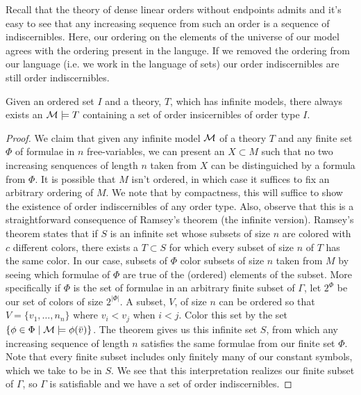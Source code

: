 Recall that the theory of dense linear orders without endpoints admits \qe and it's easy to see that any increasing sequence from such an order is a sequence of indiscernibles. 
Here, our ordering on the elements of the universe of our model agrees with the ordering present in the languge. 
If we removed the ordering from our language (i.e. we work in the language of sets) our order indiscernibles are still order indiscernibles. 

\begin{theorem}\label{theorem_order_indiscernibles}
Given an ordered set \(I\) and a theory, \(T\), which has infinite models, there always exists an \(\mathcal{M} \models T\) containing a set of order insicernibles of order type \(I\). 
\end{theorem}


\begin{proof}
We claim that given any infinite model \(\mathcal{M}\) of a theory \(T\) and any finite set \(\Phi\) of formulae in \(n\) free-variables, we can present an \(X \subset M\) such that no two increasing senquences of length \(n\) taken from \(X\) can be distinguiched by a formula from \(\Phi\). 
It is possible that \(M\) isn't ordered, in which case it suffices to fix an arbitrary ordering of \(M\). 
We note that by compactness, this will suffice to show the existence of order indiscernibles of any order type. 
Also, observe that this is a straightforward consequence of Ramsey's theorem (the infinite version).
Ramsey's theorem states that if \(S\) is an infinite set whose subsets of size \(n\) are colored with \(c\) different colors, there exists a \(T \subset S\) for which every subset of size \(n\) of \(T\) has the same color. 
In our case, subsets of \(\Phi\) color subsets of size \(n\) taken from \(M\) by seeing which formulae of \(\Phi\) are true of the (ordered) elements of the subset. %
More specifically if \(\Phi\) is the set of formulae in an arbitrary finite subset of \(\Gamma\), let \(2^\Phi\) be our set of colors of size \(2^{|\Phi|}\). 
A subset, \(V\), of size \(n\) can be ordered so that \(V = \{v_1, \ldots, n_n\}\) where \(v_i < v_j\) when \(i < j\). 
Color this set by the set \(\{\phi \in \Phi \mid \mathcal{M} \models \phi(\bar{v})\}\). 
The theorem gives us this infinite set \(S\), from which any increasing sequence of length \(n\) satisfies the same formulae from our finite set \(\Phi\).
Note that every finite subset includes only finitely many of our constant symbols, which we take to be in \(S\). 
We see that this interpretation realizes our finite subset of \(\Gamma\), so \(\Gamma\) is satisfiable and we have a set of order indiscernibles. 
\end{proof}

